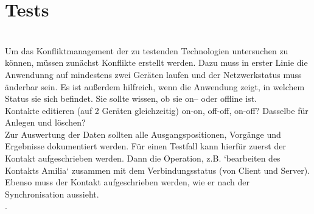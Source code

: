\section{Tests}
\\
Um das Konfliktmanagement der zu testenden Technologien untersuchen zu können, müssen zunächst Konflikte erstellt werden. Dazu muss in erster Linie die Anwendunng auf mindestens zwei Geräten laufen und der Netzwerkstatus muss änderbar sein. Es ist außerdem hilfreich, wenn die Anwendung zeigt, in welchem Status sie sich befindet. Sie sollte wissen, ob sie on-- oder offline ist.\\
Kontakte editieren (auf 2 Geräten gleichzeitig) on-on, off-off, on-off? Dasselbe für Anlegen und löschen?\\
Zur Auswertung der Daten sollten alle Ausgangspositionen, Vorgänge und Ergebnisse dokumentiert werden. Für einen Testfall kann hierfür zuerst der Kontakt aufgeschrieben werden. Dann die Operation, z.B. `bearbeiten des Kontakts Amilia` zusammen mit dem Verbindungsstatus (von Client und Server). Ebenso muss der Kontakt aufgeschrieben werden, wie er nach der Synchronisation aussieht. \\
.